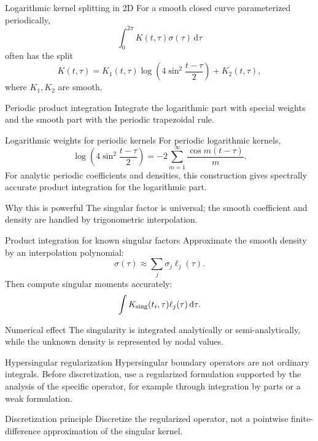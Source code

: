 \documentclass[aspectratio=169,11pt]{beamer}
\newcommand{\dd}{\,\mathrm d}
\begin{document}
\begin{frame}{Logarithmic kernel splitting in 2D}
\small
For a smooth closed curve parameterized periodically,
\[
  \int_0^{2\pi}K(t,\tau)\sigma(\tau)\dd\tau
\]
often has the split
\[
  K(t,\tau)=
  K_1(t,\tau)\log\!\left(4\sin^2\frac{t-\tau}{2}\right)
  +K_2(t,\tau),
\]
where $K_1,K_2$ are smooth.

\begin{block}{Periodic product integration}
Integrate the logarithmic part with special weights and the smooth part with
the periodic trapezoidal rule.
\end{block}
\end{frame}

\begin{frame}{Logarithmic weights for periodic kernels}
\small
For periodic logarithmic kernels,
\[
\log\!\left(4\sin^2\frac{t-\tau}{2}\right)
=
-2\sum_{m=1}^{\infty}\frac{\cos m(t-\tau)}{m}.
\]
For analytic periodic coefficients and densities, this construction gives
spectrally accurate product integration for the logarithmic part.

\begin{block}{Why this is powerful}
The singular factor is universal; the smooth coefficient and density are
handled by trigonometric interpolation.
\end{block}
\end{frame}

\begin{frame}{Product integration for known singular factors}
\small
Approximate the smooth density by an interpolation polynomial:
\[
  \sigma(\tau)\approx \sum_j \sigma_j\ell_j(\tau).
\]
Then compute singular moments accurately:
\[
  \int K_{\rm sing}(t_i,\tau)\ell_j(\tau)\dd\tau.
\]

\begin{block}{Numerical effect}
The singularity is integrated analytically or semi-analytically, while the
unknown density is represented by nodal values.
\end{block}
\end{frame}

\begin{frame}{Hypersingular regularization}
\small
Hypersingular boundary operators are not ordinary integrals.  Before
discretization, use a regularized formulation supported by the analysis of
the specific operator, for example through integration by parts or a weak
formulation.

\begin{block}{Discretization principle}
Discretize the regularized operator, not a pointwise finite-difference
approximation of the singular kernel.
\end{block}
\end{frame}
\end{document}
